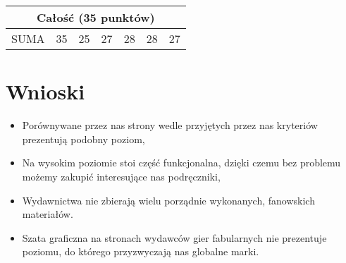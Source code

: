 \documentclass[a4paper,11pt]{article}
\begin{document}
\begin{tabular}{|l|c||c|c|c|c|c|}
	\multicolumn{7}{|c|}{\textbf{Całość (35 punktów)}} \\
	\hline
	SUMA & 35 & 25 & 27 & 28 & 28 & 27 \\ 
	\hline
	
\end{tabular}

\newpage

\section {Wnioski}
\begin{itemize}
	\item Porównywane przez nas strony wedle przyjętych przez nas kryteriów prezentują podobny poziom,
	\item Na wysokim poziomie stoi część funkcjonalna, dzięki czemu bez problemu możemy zakupić interesujące nas podręczniki,
	\item Wydawnictwa nie zbierają wielu porządnie wykonanych, fanowskich materiałów.
	\item Szata graficzna na stronach wydawców gier fabularnych nie prezentuje poziomu, do którego przyzwyczają nas globalne marki.
\end{itemize} 
\end{document}

